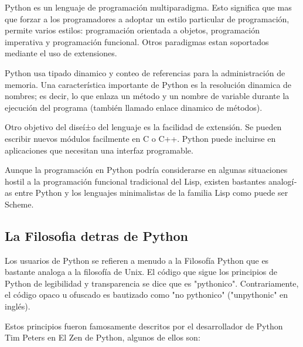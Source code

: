 Python es un lenguaje de programación multiparadigma. Esto significa que mas que forzar a los programadores a adoptar un estilo particular de programación, permite varios estilos: programación orientada a objetos, programación imperativa y programación funcional. Otros paradigmas estan soportados mediante el uso de extensiones.

Python usa tipado dinamico y conteo de referencias para la administración de memoria. Una caracterí­stica importante de Python es la resolución dinamica de nombres;  es decir, lo que enlaza un método y un nombre de variable durante la ejecución  del programa (también llamado enlace dinamico de métodos).
  
Otro objetivo del diseí±o del lenguaje es la facilidad de extensión. Se pueden escribir nuevos módulos facilmente en C o C++. Python puede incluirse en aplicaciones que necesitan una interfaz programable.

Aunque la programación en Python podrí­a considerarse en algunas situaciones hostil a la programación funcional tradicional del Lisp, existen bastantes analogí­as entre Python y los lenguajes minimalistas de la familia Lisp como puede ser Scheme.


\subsection{La Filosofia detras de Python}

Los usuarios de Python se refieren a menudo a la Filosofí­a Python que es bastante analoga a la filosofí­a de Unix. El código que sigue los principios de Python de legibilidad y transparencia se dice que es "pythonico". Contrariamente, el código opaco u ofuscado es bautizado como "no pythonico" ("unpythonic" en inglés).

Estos principios fueron famosamente descritos por el desarrollador de Python Tim Peters en El Zen de Python, algunos de ellos son:

